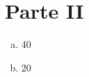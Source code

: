 \documentclass{article}
\begin{document}
\section*{Parte II}
\begin{enumerate}[a)]
\item 40 %
\item 20%
\end{enumerate}
\end{document}
